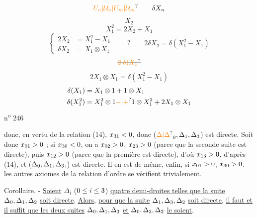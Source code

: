 \[\unsure{U_n|\mathcal U_n|U_m|\mathcal U_m}\qquad\delta X_n\]
\[X_2\]
\[X_1^2=2X_2+X_1\]
\[
\left\{\begin{aligned}
2X_2&=X_1^2-X_1\\
\delta X_2&=X_1\otimes X_1
\end{aligned}\right.
\qquad ?\qquad 2\delta X_2=\delta(X_1^2-X_1)
\]
\[\deleted{\unsure{2.\delta(X_1}}\]
\[2X_1\otimes X_1=\delta(X_1^2-X_1)\]
\[
\begin{aligned}
\delta(X_1)&=X_1\otimes1+1\otimes X_1\\
\delta(X_1^2)&=X_1^2\otimes1\unsure{-|+}1\otimes X_1^2+2X_1\otimes X_1
\end{aligned}
\]
n\textsuperscript{o} 246

donc, en vertu de la relation (14), $x_{31}<0$, donc ($\unsure{\Delta|\handwritten{\Delta}}_{\handwritten{0}},\Delta_{\handwritten{1}},\Delta_{\handwritten{3}}$) est directe. Soit donc $x_{01}>0$ ; si $x_{30}<0$, on a $x_{02}>0$, $x_{23}>0$ (parce que la seconde suite est directe), puis $x_{12}>0$ (parce que la première est directe), d'où $x_{13}>0$, d'après (14), et ($\Delta_{0},\Delta_{1},\Delta_{3},$) est directe. Il en est de même, enfin, si $x_{01}>0$, $x_{30}>0$. les autres axiomes de la relation d'ordre se vérifient trivialement.

Corollaire. - \uline{Soient} $\Delta_i$ ($0\leq i\leq3$) \uline{quatre demi-droites telles que la suite} $\Delta_{0},\Delta_{1},\Delta_{2}$ \uline{soit directe}. \uline{Alors}, \uline{pour que la suite} $\Delta_{1},\Delta_{3},\Delta_{2}$ \uline{soit directe}, \uline{il faut et il suffit que les deux suites} $\Delta_{0},\Delta_{1},\Delta_{3}$ \uline{et} $\Delta_{0},\Delta_{3},\Delta_{2}$ \uline{le soient}.

